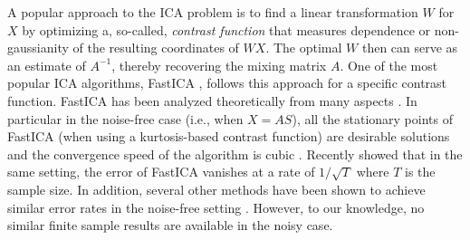 \documentclass[jmlr]{article}
\theoremstyle{definition}
\begin{document}
A popular approach to the ICA problem is to find a linear transformation $W$ for $X$ by optimizing a, so-called, \emph{contrast function} 
that measures dependence or non-gaussianity of the resulting coordinates of $WX$.
The optimal $W$ then can serve as an estimate of $A^{-1}$, thereby recovering the mixing matrix $A$.
One of the most popular ICA algorithms, FastICA \citep{hyvarinen1999fast},
follows this approach for a specific contrast function.  
FastICA has been analyzed theoretically from many aspects \citep{douglas2003convergence,tichavsky2006performance,oja2006fastica,ollila2010deflation,dermoune2013fastica,wei2014convergence}.
In particular in the noise-free case (i.e., when $X = AS$), all the stationary points of FastICA (when using a kurtosis-based contrast function) are desirable solutions and the convergence speed of the algorithm is cubic \citep{douglas2003convergence}. 
Recently \citet{miettinen2014fourth} showed  that in the same setting, the error of FastICA vanishes at a rate of $1/\sqrt{T}$ where $T$ is the sample size.
In addition, several other methods have been shown to achieve similar error rates in the noise-free setting \citep[e.g.,][]{eriksson2003characteristic,samarov2004nonparametric,chen2005consistent,chen2006efficient}.
However, to our knowledge, no similar finite sample results are available in the noisy case.
\end{document}
